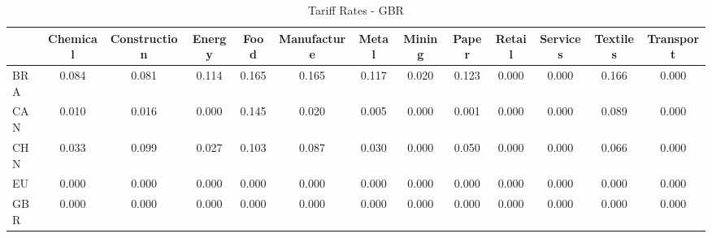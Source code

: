 \begin{table}[htbp]
\centering
\caption{Tariff Rates - GBR} 
\label{tab:tariff_GBR}
\begin{tabular}{lcccccccccccc}
  \hline
 & Chemical & Construction & Energy & Food & Manufacture & Metal & Mining & Paper & Retail & Services & Textiles & Transport \\ 
  \hline
BRA & \textcolor[RGB]{36,23,219}{0.084} & \textcolor[RGB]{40,26,215}{0.081} & \textcolor[RGB]{21,14,234}{0.114} & \textcolor[RGB]{8,5,246}{0.165} & \textcolor[RGB]{6,4,249}{0.165} & \textcolor[RGB]{17,11,238}{0.117} & \textcolor[RGB]{96,62,159}{0.020} & \textcolor[RGB]{15,10,240}{0.123} & \textcolor[RGB]{255,165,0}{0.000} & \textcolor[RGB]{255,165,0}{0.000} & \textcolor[RGB]{4,3,251}{0.166} & \textcolor[RGB]{255,165,0}{0.000} \\ 
  CAN & \textcolor[RGB]{106,69,149}{0.010} & \textcolor[RGB]{98,63,157}{0.016} & \textcolor[RGB]{123,80,132}{0.000} & \textcolor[RGB]{11,7,244}{0.145} & \textcolor[RGB]{94,61,162}{0.020} & \textcolor[RGB]{110,72,144}{0.005} & \textcolor[RGB]{255,165,0}{0.000} & \textcolor[RGB]{121,78,134}{0.001} & \textcolor[RGB]{255,165,0}{0.000} & \textcolor[RGB]{255,165,0}{0.000} & \textcolor[RGB]{30,19,225}{0.089} & \textcolor[RGB]{255,165,0}{0.000} \\ 
  CHN & \textcolor[RGB]{79,51,176}{0.033} & \textcolor[RGB]{28,18,227}{0.099} & \textcolor[RGB]{85,55,170}{0.027} & \textcolor[RGB]{25,16,230}{0.103} & \textcolor[RGB]{32,21,223}{0.087} & \textcolor[RGB]{81,52,174}{0.030} & \textcolor[RGB]{255,165,0}{0.000} & \textcolor[RGB]{57,37,198}{0.050} & \textcolor[RGB]{255,165,0}{0.000} & \textcolor[RGB]{255,165,0}{0.000} & \textcolor[RGB]{49,32,206}{0.066} & \textcolor[RGB]{255,165,0}{0.000} \\ 
  EU & \textcolor[RGB]{255,165,0}{0.000} & \textcolor[RGB]{255,165,0}{0.000} & \textcolor[RGB]{255,165,0}{0.000} & \textcolor[RGB]{255,165,0}{0.000} & \textcolor[RGB]{255,165,0}{0.000} & \textcolor[RGB]{255,165,0}{0.000} & \textcolor[RGB]{255,165,0}{0.000} & \textcolor[RGB]{255,165,0}{0.000} & \textcolor[RGB]{255,165,0}{0.000} & \textcolor[RGB]{255,165,0}{0.000} & \textcolor[RGB]{255,165,0}{0.000} & \textcolor[RGB]{255,165,0}{0.000} \\ 
  GBR & \textcolor[RGB]{255,165,0}{0.000} & \textcolor[RGB]{255,165,0}{0.000} & \textcolor[RGB]{255,165,0}{0.000} & \textcolor[RGB]{255,165,0}{0.000} & \textcolor[RGB]{255,165,0}{0.000} & \textcolor[RGB]{255,165,0}{0.000} & \textcolor[RGB]{255,165,0}{0.000} & \textcolor[RGB]{255,165,0}{0.000} & \textcolor[RGB]{255,165,0}{0.000} & \textcolor[RGB]{255,165,0}{0.000} & \textcolor[RGB]{255,165,0}{0.000} & \textcolor[RGB]{255,165,0}{0.000} \\ 

\end{tabular}
\end{table}
